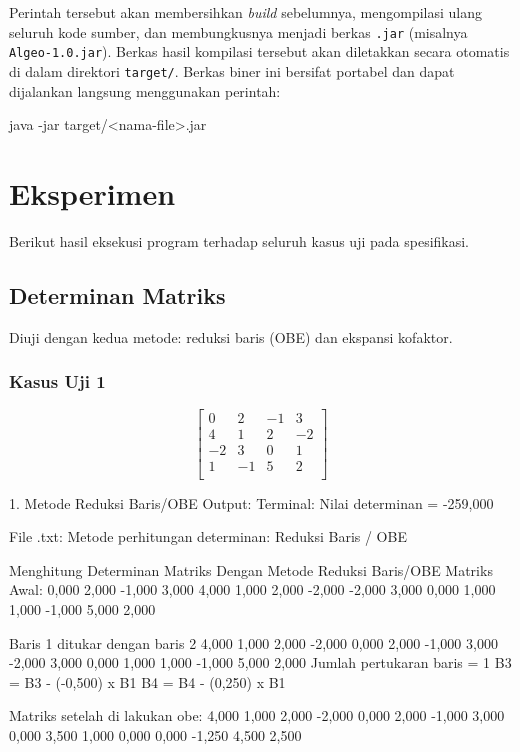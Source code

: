 \documentclass[12pt]{article}
\begin{document}
\begin{enumerate}
Perintah tersebut akan membersihkan \textit{build} sebelumnya, mengompilasi ulang seluruh kode sumber, dan membungkusnya menjadi berkas \texttt{.jar} (misalnya \texttt{Algeo-}\allowbreak\texttt{1.0.jar}). Berkas hasil kompilasi tersebut akan diletakkan secara otomatis di dalam direktori \texttt{target/}. Berkas biner ini bersifat portabel dan dapat dijalankan langsung menggunakan perintah:
\begin{keluaran}
java -jar target/<nama-file>.jar
\end{keluaran}


\section{Eksperimen}
Berikut hasil eksekusi program terhadap seluruh kasus uji pada spesifikasi.

\subsection{Determinan Matriks}
Diuji dengan kedua metode: reduksi baris (OBE) dan ekspansi kofaktor.
\subsubsection{Kasus Uji 1}
\begin{equation}
    \begin{bmatrix}
        0 & 2 & -1 & 3 \\
        4 & 1 & 2 & -2 \\
        -2 & 3 & 0 & 1 \\
        1 & -1 & 5 & 2 \\
    \end{bmatrix}
\end{equation}
\begin{keluaran}
1. Metode Reduksi Baris/OBE
Output:
Terminal:
Nilai determinan = -259,000

File .txt:
Metode perhitungan determinan: Reduksi Baris / OBE

Menghitung Determinan Matriks Dengan Metode Reduksi Baris/OBE
Matriks Awal:
0,000 2,000 -1,000 3,000 
4,000 1,000 2,000 -2,000 
-2,000 3,000 0,000 1,000 
1,000 -1,000 5,000 2,000 

Baris 1 ditukar dengan baris 2
4,000 1,000 2,000 -2,000 
0,000 2,000 -1,000 3,000 
-2,000 3,000 0,000 1,000 
1,000 -1,000 5,000 2,000 
Jumlah pertukaran baris = 1
B3 = B3 - (-0,500) x B1
B4 = B4 - (0,250) x B1

Matriks setelah di lakukan obe: 
4,000 1,000 2,000 -2,000 
0,000 2,000 -1,000 3,000 
0,000 3,500 1,000 0,000 
0,000 -1,250 4,500 2,500 


\end{keluaran}
\end{enumerate}
\end{document}
